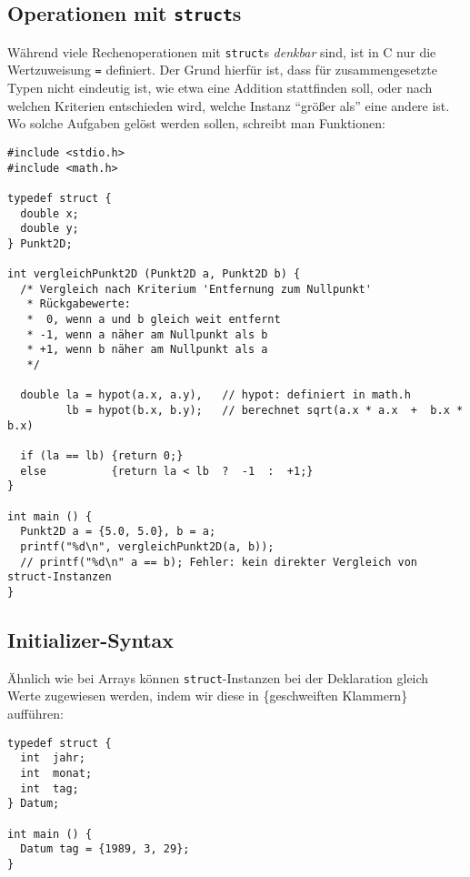 \subsection{Operationen mit \texttt{struct}s}
Während viele Rechenoperationen mit \texttt{struct}s \emph{denkbar} sind, ist in C nur die Wertzuweisung \texttt{=} definiert. Der Grund hierfür ist, dass für zusammengesetzte Typen nicht eindeutig ist, wie etwa eine Addition stattfinden soll, oder nach welchen Kriterien entschieden wird, welche Instanz \enquote{größer als} eine andere ist. Wo solche Aufgaben gelöst werden sollen, schreibt man Funktionen:

\begin{codebox}
\begin{verbatim}
#include <stdio.h>
#include <math.h>

typedef struct {
  double x;
  double y;
} Punkt2D;

int vergleichPunkt2D (Punkt2D a, Punkt2D b) {
  /* Vergleich nach Kriterium 'Entfernung zum Nullpunkt'
   * Rückgabewerte:
   *  0, wenn a und b gleich weit entfernt
   * -1, wenn a näher am Nullpunkt als b
   * +1, wenn b näher am Nullpunkt als a
   */

  double la = hypot(a.x, a.y),   // hypot: definiert in math.h
         lb = hypot(b.x, b.y);   // berechnet sqrt(a.x * a.x  +  b.x * b.x)

  if (la == lb) {return 0;}
  else          {return la < lb  ?  -1  :  +1;}
}

int main () {
  Punkt2D a = {5.0, 5.0}, b = a;
  printf("%d\n", vergleichPunkt2D(a, b));
  // printf("%d\n" a == b); Fehler: kein direkter Vergleich von struct-Instanzen
}
\end{verbatim}
\end{codebox}

\subsection{Initializer-Syntax} \label{sec:structInit}
Ähnlich wie bei Arrays können \texttt{struct}-Instanzen bei der Deklaration gleich Werte zugewiesen werden, indem wir diese in \{geschweiften Klammern\} aufführen:

\begin{codebox}
\begin{verbatim}
typedef struct {
  int  jahr;
  int  monat;
  int  tag;
} Datum;

int main () {
  Datum tag = {1989, 3, 29};
}
\end{verbatim}
\end{codebox}

